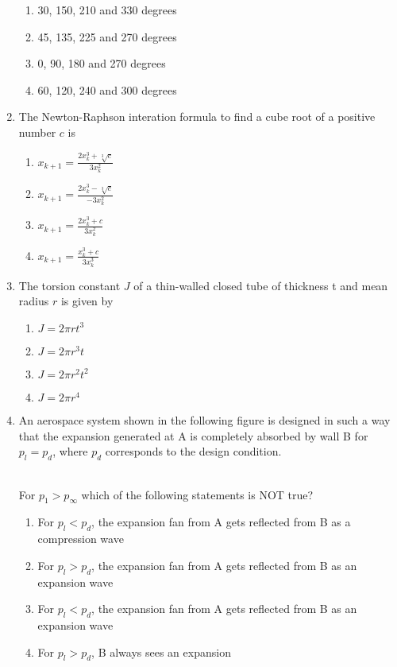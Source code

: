 \documentclass[journal]{IEEEtran}
\begin{document}
\begin{enumerate}
		\begin{enumerate}
			\item 30, 150, 210 and 330 degrees
			\item 45, 135, 225 and 270 degrees
			\item 0, 90, 180 and 270 degrees
			\item 60, 120, 240 and 300 degrees
		\end{enumerate}
	\item The Newton-Raphson interation formula to find a cube root of a positive number $c$ is
		\begin{enumerate}
			\item $x_{k+1} = \frac{2x_k^3+\sqrt[3]{c}}{3x_k^2}$
			\item $x_{k+1} = \frac{2x_k^3-\sqrt[3]{c}}{-3x_k^2}$
			\item $x_{k+1} = \frac{2x_k^3+{c}}{3x_k^2}$
			\item $x_{k+1} = \frac{x_k^3+{c}}{3x_k^3}$
		\end{enumerate}
	\item The torsion constant $J$ of a thin-walled closed tube of thickness t and mean radius $r$ is given by
		\begin{enumerate}
			\item $J=2\pi rt^3$
			\item $J=2\pi r^3t$
			\item $J=2\pi r^2t^2$
			\item $J=2\pi r^4$
		\end{enumerate}
	\item An aerospace system shown in the following figure is designed in such a way that the expansion generated at A is completely absorbed by wall B for $p_l=p_d$, where $p_d$ corresponds to the design condition.
		\begin{figure}[h!]
			
		\end{figure}\\
		For $p_1>p_{\infty}$ which of the following statements is NOT true?
		\begin{enumerate}
			\item For $p_l<p_d$, the expansion fan from A gets reflected from B as a compression wave
			\item For $p_l>p_d$, the expansion fan from A gets reflected from B as an expansion wave
			\item For $p_l<p_d$, the expansion fan from A gets reflected from B as an expansion wave
			\item For $p_l>p_d$, B always sees an expansion

\end{enumerate}
\end{enumerate}
\end{document}
